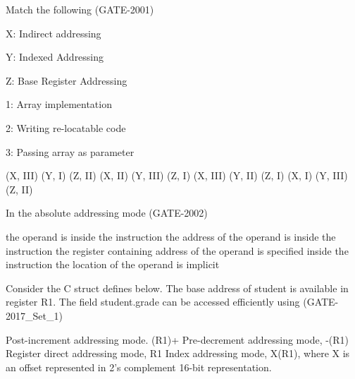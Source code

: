 \begin{questyle}
  \question  Match the following  (GATE-2001)

  \begin{multiColList}[2]
    \item[X:] Indirect addressing
    \item[Y:] Indexed Addressing
    \item[Z:] Base Register Addressing
    \item[1:] Array implementation
    \item[2:] Writing re-locatable code
    \item[3:] Passing array as parameter
  \end{multiColList}

  \begin{oneparchoices}
    \CorrectChoice  (X, III) (Y, I) (Z, II)
    \choice         (X, II) (Y, III) (Z, I)
    \choice         (X, III) (Y, II) (Z, I)
    \choice         (X, I) (Y, III) (Z, II)
  \end{oneparchoices}
\end{questyle}

\begin{questyle}
  \question  In the absolute addressing mode  (GATE-2002)

  \begin{choices}
    \choice         the operand is inside the instruction
    \CorrectChoice  the address of the operand is inside the instruction
    \choice         the register containing address of the operand is specified inside the instruction
    \choice         the location of the operand is implicit
  \end{choices}
\end{questyle}

\begin{questyle}
  \question  Consider the C struct defines below. The base address of student is available in
             register R1. The field student.grade can be accessed efficiently using  (GATE-2017\_Set\_1)
             

  \begin{choices}
    \choice         Post-increment addressing mode. (R1)+
    \choice         Pre-decrement addressing mode, -(R1)
    \choice         Register direct addressing mode, R1
    \CorrectChoice  Index addressing mode, X(R1), where X is an offset represented in 2’s complement 16-bit representation.
  \end{choices}
\end{questyle}


